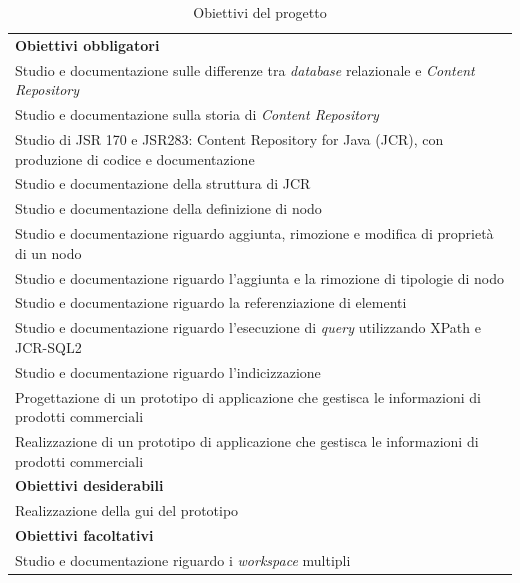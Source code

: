 	\begin{table}[H]
		\begin{tabularx}{\textwidth}{| X |}
			\Xhline{2\arrayrulewidth}
			\textbf{Obiettivi obbligatori} \\
			\Xhline{2\arrayrulewidth}
			Studio e documentazione sulle differenze tra \textit{database} relazionale e \textit{Content Repository} \\
			\hline
			Studio e documentazione sulla storia di \textit{Content Repository} \\
			\hline
			Studio di JSR 170 e JSR283: Content Repository for Java (JCR), con produzione di codice e documentazione \\
			\hline
			Studio e documentazione della struttura di JCR \\
			\hline
			Studio e documentazione della definizione di nodo \\
			\hline
			Studio e documentazione riguardo aggiunta, rimozione e modifica di proprietà di un nodo \\
			\hline
			Studio e documentazione riguardo l'aggiunta e la rimozione di tipologie di nodo \\
			\hline
			Studio e documentazione riguardo la referenziazione di elementi \\
			\hline
			Studio e documentazione riguardo l'esecuzione di \textit{query} utilizzando XPath e JCR-SQL2 \\
			\hline
			Studio e documentazione riguardo l'indicizzazione \\
			\hline
			Progettazione di un prototipo di applicazione che gestisca le informazioni di prodotti commerciali \\
			\hline
			Realizzazione di un prototipo di applicazione che gestisca le informazioni di prodotti commerciali \\
			\Xhline{2\arrayrulewidth}
			\textbf{Obiettivi desiderabili} \\
			\Xhline{2\arrayrulewidth}
			Realizzazione della \gls{gui} del prototipo \\
			\Xhline{2\arrayrulewidth}
			\textbf{Obiettivi facoltativi} \\
			\Xhline{2\arrayrulewidth}
			Studio e documentazione riguardo i \textit{workspace} multipli \\
			\hline
		\end{tabularx}
		\caption{Obiettivi del progetto}
	\end{table}
	
